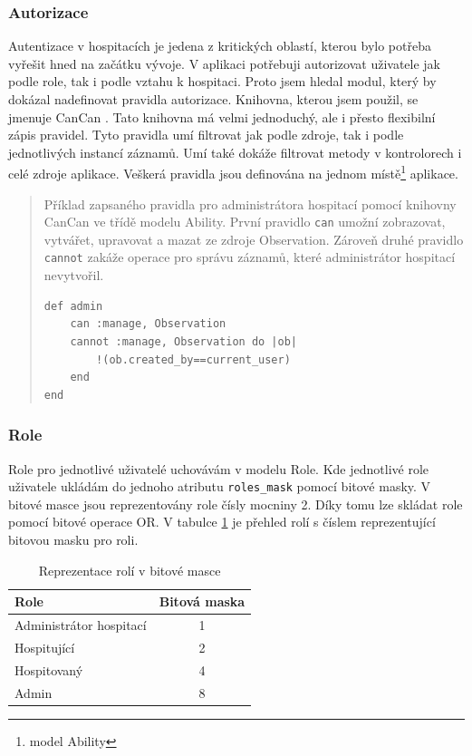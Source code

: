\subsubsection{Autorizace}
Autentizace v hospitacích je jedena z kritických oblastí, kterou bylo potřeba vyřešit hned na začátku vývoje. V aplikaci potřebuji autorizovat uživatele jak podle role, tak i podle vztahu k hospitaci. Proto jsem hledal modul, který by dokázal nadefinovat pravidla autorizace. Knihovna, kterou jsem použil, se jmenuje CanCan \cite{cancan} . Tato knihovna má velmi jednoduchý, ale i přesto flexibilní zápis pravidel. Tyto pravidla umí filtrovat jak podle zdroje, tak i podle jednotlivých instancí záznamů. Umí také dokáže filtrovat metody v kontrolorech i celé zdroje aplikace. Veškerá pravidla jsou definována na jednom místě\footnote{model Ability} aplikace.

\begin{quote}
Příklad zapsaného pravidla pro administrátora hospitací pomocí knihovny CanCan ve třídě modelu Ability. První pravidlo \verb|can| umožní zobrazovat, vytvářet, upravovat a mazat ze zdroje Observation. Zároveň druhé pravidlo \verb|cannot| zakáže operace pro správu záznamů, které administrátor hospitací nevytvořil.

\begin{verbatim}
def admin
    can :manage, Observation
    cannot :manage, Observation do |ob|
        !(ob.created_by==current_user)
    end
end
\end{verbatim} 
\end{quote}

\subsubsection{Role}
\label{sec:role}
Role pro jednotlivé uživatelé uchovávám v modelu Role. Kde jednotlivé role uživatele ukládám do jednoho atributu \verb|roles_mask| pomocí bitové masky. V bitové masce jsou reprezentovány role čísly mocniny 2. Díky tomu lze skládat role pomocí bitové operace OR. V tabulce \ref{tab:role} je přehled rolí s číslem reprezentující bitovou masku pro roli.

\begin{table}[h]
\begin{center}
\begin{tabular}{|l|c|}

\hline
\textbf{Role} & \textbf{Bitová maska} \\ \hline
Administrátor hospitací & 1 \\
Hospitující & 2 \\ 
Hospitovaný & 4 \\
Admin & 8 \\\hline

\end{tabular}
\caption{Reprezentace rolí v bitové masce}
\label{tab:role}
\end{center}
\end{table}


